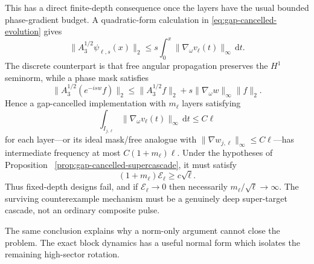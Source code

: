 \documentclass[11pt]{article}
\newcommand{\dd}{\,\mathrm d}
\theoremstyle{definition}
\theoremstyle{remark}
\begin{document}
This has a direct finite-depth consequence once the layers have the usual
bounded phase-gradient budget.  A quadratic-form calculation in
\eqref{eq:gap-cancelled-evolution} gives
\begin{equation}
 \|A_3^{1/2}\psi_{\ell,s}(x)\|_2
 \leq s\int_0^x\|\nabla_\omega v_\ell(t)\|_\infty\dd t.
 \label{eq:continuous-gradient-growth}
\end{equation}
The discrete counterpart is that free angular propagation preserves the
$H^1$ seminorm, while a phase mask satisfies
\begin{equation}
 \|A_3^{1/2}(e^{-isw}f)\|_2
 \leq\|A_3^{1/2}f\|_2+s\|\nabla_\omega w\|_\infty\|f\|_2.
 \label{eq:phase-mask-gradient-growth}
\end{equation}
Hence a gap-cancelled implementation with $m_\ell$ layers satisfying
\begin{equation}
 \int_{I_{j,\ell}}\|\nabla_\omega v_\ell(t)\|_\infty\dd t
 \leq C\ell
 \label{eq:layer-gradient-budget}
\end{equation}
for each layer---or its ideal mask/free analogue with
$\|\nabla w_{j,\ell}\|_\infty\leq C\ell$---has intermediate frequency at
most $C(1+m_\ell)\ell$.  Under the hypotheses of Proposition
~\ref{prop:gap-cancelled-supercascade}, it must satisfy
\begin{equation}
 (1+m_\ell)\mathcal E_\ell\geq c\sqrt\ell.
 \label{eq:composite-depth-cost}
\end{equation}
Thus fixed-depth designs fail, and if $\mathcal E_\ell\to0$ then necessarily
$m_\ell/\sqrt\ell\to\infty$.  The surviving counterexample mechanism must be
a genuinely deep super-target cascade, not an ordinary composite pulse.

The same conclusion explains why a norm-only argument cannot close the
problem.  The exact block dynamics has a useful normal form which isolates the
remaining high-sector rotation.
\end{document}
